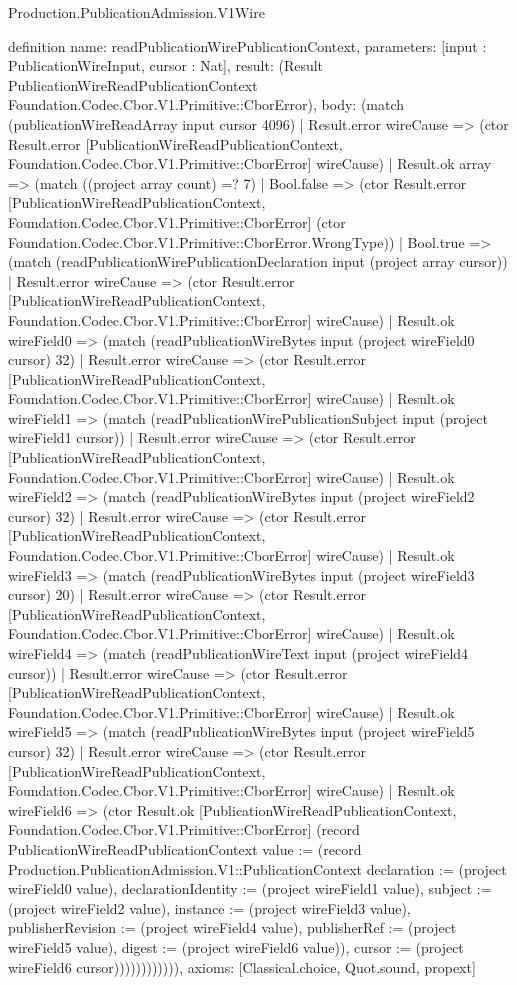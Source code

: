 \begin{lexlean}{Production.PublicationAdmission.V1Wire}
\begin{semanticmodule}
definition{
  name: readPublicationWirePublicationContext,
  parameters: [input : PublicationWireInput, cursor : Nat],
  result: (Result PublicationWireReadPublicationContext Foundation.Codec.Cbor.V1.Primitive::CborError),
  body: (match (publicationWireReadArray input cursor 4096)
    | Result.error wireCause => (ctor Result.error [PublicationWireReadPublicationContext, Foundation.Codec.Cbor.V1.Primitive::CborError] wireCause)
    | Result.ok array => (match ((project array count) =? 7)
      | Bool.false => (ctor Result.error [PublicationWireReadPublicationContext, Foundation.Codec.Cbor.V1.Primitive::CborError] (ctor Foundation.Codec.Cbor.V1.Primitive::CborError.WrongType))
      | Bool.true => (match (readPublicationWirePublicationDeclaration input (project array cursor))
        | Result.error wireCause => (ctor Result.error [PublicationWireReadPublicationContext, Foundation.Codec.Cbor.V1.Primitive::CborError] wireCause)
        | Result.ok wireField0 => (match (readPublicationWireBytes input (project wireField0 cursor) 32)
          | Result.error wireCause => (ctor Result.error [PublicationWireReadPublicationContext, Foundation.Codec.Cbor.V1.Primitive::CborError] wireCause)
          | Result.ok wireField1 => (match (readPublicationWirePublicationSubject input (project wireField1 cursor))
            | Result.error wireCause => (ctor Result.error [PublicationWireReadPublicationContext, Foundation.Codec.Cbor.V1.Primitive::CborError] wireCause)
            | Result.ok wireField2 => (match (readPublicationWireBytes input (project wireField2 cursor) 32)
              | Result.error wireCause => (ctor Result.error [PublicationWireReadPublicationContext, Foundation.Codec.Cbor.V1.Primitive::CborError] wireCause)
              | Result.ok wireField3 => (match (readPublicationWireBytes input (project wireField3 cursor) 20)
                | Result.error wireCause => (ctor Result.error [PublicationWireReadPublicationContext, Foundation.Codec.Cbor.V1.Primitive::CborError] wireCause)
                | Result.ok wireField4 => (match (readPublicationWireText input (project wireField4 cursor))
                  | Result.error wireCause => (ctor Result.error [PublicationWireReadPublicationContext, Foundation.Codec.Cbor.V1.Primitive::CborError] wireCause)
                  | Result.ok wireField5 => (match (readPublicationWireBytes input (project wireField5 cursor) 32)
                    | Result.error wireCause => (ctor Result.error [PublicationWireReadPublicationContext, Foundation.Codec.Cbor.V1.Primitive::CborError] wireCause)
                    | Result.ok wireField6 => (ctor Result.ok [PublicationWireReadPublicationContext, Foundation.Codec.Cbor.V1.Primitive::CborError] (record PublicationWireReadPublicationContext {value := (record Production.PublicationAdmission.V1::PublicationContext {declaration := (project wireField0 value), declarationIdentity := (project wireField1 value), subject := (project wireField2 value), instance := (project wireField3 value), publisherRevision := (project wireField4 value), publisherRef := (project wireField5 value), digest := (project wireField6 value)}), cursor := (project wireField6 cursor)}))))))))))),
  axioms: [Classical.choice, Quot.sound, propext]
}


\end{semanticmodule}
\end{lexlean}
